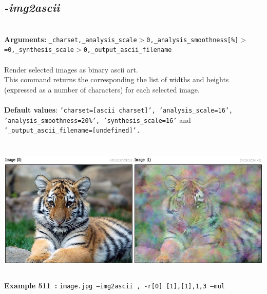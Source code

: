 \documentclass[a4paper,11pt,twoside]{book}
\begin{document}
\subsection{\emph{-img2ascii} }\vspace*{-0.5em}
~\\\textbf{Arguments: } 
{\small \texttt{\_charset,\_analysis\_scale$>$0,\_analysis\_smoothness[\%]$>$=0,\_synthesis\_scale$>$0,\_output\_ascii\_filename}}\\~\\
Render selected images as binary ascii art.
~\\This command returns the corresponding the list of widths and heights (expressed as a number of characters) for each selected image.
~\\~\\\textbf{Default values}: {\small \texttt{'charset=[ascii charset]', 'analysis\_scale=16', 'analysis\_smoothness=20\%', 'synthesis\_scale=16'} and \texttt{'\_output\_ascii\_filename=[undefined]'.}}
\begin{center}\includegraphics[keepaspectratio=true,height=7cm,width=\textwidth]{img/gmic_def511.jpg}\\
{\footnotesize \textbf{Example 511~:} \texttt{image.jpg --img2ascii , -r[0] [1],[1],1,3 --mul}}
\end{center}
\end{document}
